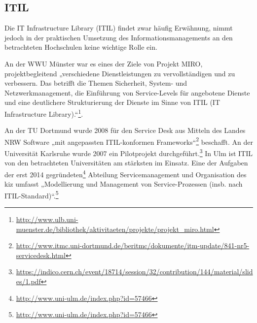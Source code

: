 \subsection{ITIL}
Die IT Infrastructure Library (ITIL) findet zwar häufig Erwähnung, nimmt jedoch in der praktischen Umsetzung des Informationsmanagements an den betrachteten Hochschulen keine wichtige Rolle ein.

An der WWU Münster war es eines der Ziele von Projekt MIRO, projektbegleitend „verschiedene Dienstleistungen zu vervollständigen und zu verbessern. Das betrifft die Themen Sicherheit, System- und Netzwerkmanagement, die Einführung von Service-Levels für angebotene Dienste und eine deutlichere Strukturierung der Dienste im Sinne von ITIL (IT Infrastructure Library).“\footnote{\url{http://www.ulb.uni-muenster.de/bibliothek/aktivitaeten/projekte/projekt_miro.html}}.

An der TU Dortmund wurde 2008 für den Service Desk aus Mitteln des Landes NRW Software „mit angepassten ITIL-konformen Frameworks“\footnote{\url{http://www.itmc.uni-dortmund.de/beritmc/dokumente/itm-update/841-nr5-servicedesk.html}} beschafft.
An der Universität Karlsruhe wurde 2007 ein Pilotprojekt durchgeführt.\footnote{\url{https://indico.cern.ch/event/18714/session/32/contribution/144/material/slides/1.pdf}}
In Ulm ist ITIL von den betrachteten Universitäten am stärksten im Einsatz. Eine der Aufgaben der erst 2014 gegründeten\footnote{\url{http://www.uni-ulm.de/index.php?id=57466}} Abteilung Servicemanagement und Organisation des kiz umfasst „Modellierung und Management von Service-Prozessen (insb. nach ITIL-Standard)“.\footnote{\url{http://www.uni-ulm.de/index.php?id=57466}}